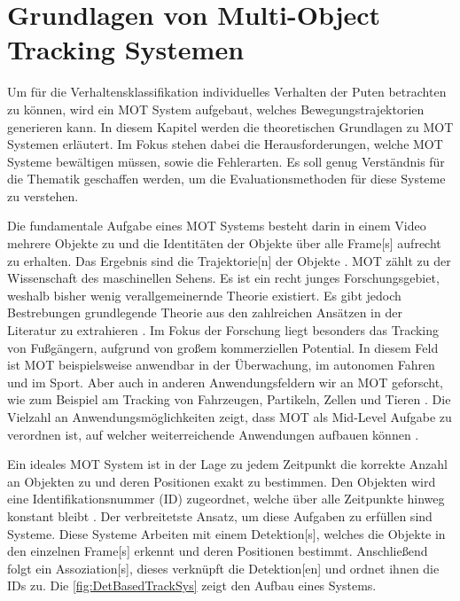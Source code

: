\section{Grundlagen von Multi-Object Tracking Systemen} \label{sec:MOT Grundlagen}

Um für die Verhaltensklassifikation individuelles Verhalten der Puten betrachten zu können, wird ein \gls{MOT} System aufgebaut, welches Bewegungstrajektorien generieren kann. In diesem Kapitel werden die theoretischen Grundlagen zu \gls{MOT} Systemen erläutert. Im Fokus stehen dabei die Herausforderungen, welche \gls{MOT} Systeme bewältigen müssen, sowie die Fehlerarten. Es soll genug Verständnis für die Thematik geschaffen werden, um die Evaluationsmethoden für diese Systeme zu verstehen. 

Die fundamentale Aufgabe eines \gls{MOT} Systems besteht darin in einem Video mehrere Objekte zu  und die Identitäten der Objekte über alle \gls{Frame}[s] aufrecht zu erhalten. Das Ergebnis sind die \gls{Trajektorie}[n] der Objekte \cite{CLEAR.2008, HOTA, Luo.2022}. \gls{MOT} zählt zu der Wissenschaft des maschinellen Sehens. Es ist ein recht junges Forschungsgebiet, weshalb bisher wenig verallgemeinernde Theorie existiert. Es gibt jedoch Bestrebungen grundlegende Theorie aus den zahlreichen Ansätzen in der Literatur zu extrahieren \cite{Luo.2022}. Im Fokus der Forschung liegt besonders das Tracking von Fußgängern, aufgrund von großem kommerziellen Potential. In diesem Feld ist \gls{MOT} beispielsweise anwendbar in der Überwachung, im autonomen Fahren und im Sport. Aber auch in anderen Anwendungsfeldern wir an \gls{MOT} geforscht, wie zum Beispiel am Tracking von Fahrzeugen, Partikeln, Zellen und Tieren \cite{Luo.2022, CLEAR.2008, Crocker.1996}. Die Vielzahl an Anwendungsmöglichkeiten zeigt, dass \gls{MOT} als \gls{Mid-Level Aufgabe} zu verordnen ist, auf welcher weiterreichende Anwendungen aufbauen können \cite{Luo.2022}.\par

Ein ideales \gls{MOT} System ist in der Lage zu jedem Zeitpunkt die korrekte Anzahl an Objekten zu  und deren Positionen exakt zu bestimmen. Den Objekten wird eine Identifikationsnummer (\acrshort{ID}) zugeordnet, welche über alle Zeitpunkte hinweg konstant bleibt \cite{CLEAR.2008}. Der verbreitetste Ansatz, um diese Aufgaben zu erfüllen sind  Systeme. Diese Systeme  Arbeiten mit einem \gls{Detektion}[s], welches die Objekte in den einzelnen \gls{Frame}[s] erkennt und deren Positionen bestimmt. Anschließend folgt ein \gls{Assoziation}[s], dieses verknüpft die \gls{Detektion}[en] und ordnet ihnen die \acrshort{ID}s zu\cite{Luo.2022, HOTA}. Die \autoref{fig:DetBasedTrackSys} zeigt den Aufbau eines  Systems. 


